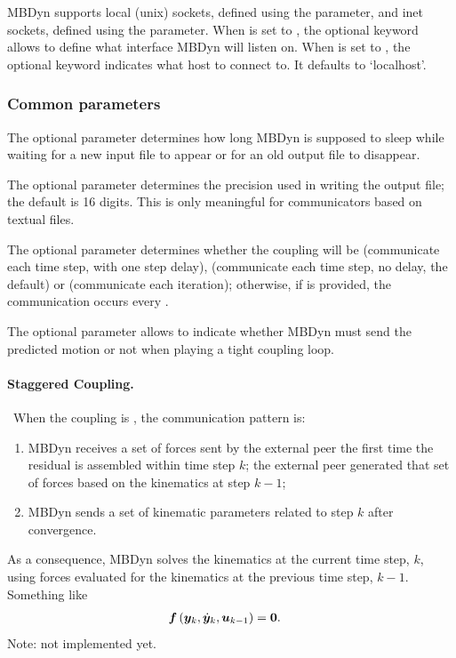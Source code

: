 MBDyn supports local (unix) sockets, defined using the  parameter,
and inet sockets, defined using the  parameter.
When  is set to , the optional keyword 
allows to define what interface MBDyn will listen on.
When  is set to , the optional keyword 
indicates what host to connect to.
It defaults to `localhost'.




\subsubsection{Common parameters}
The optional parameter  determines how long MBDyn
is supposed to sleep while waiting for a new input file to appear
or for an old output file to disappear.

The optional parameter  determines the precision
used in writing the output file; the default is 16 digits.
This is only meaningful for communicators based on textual files.

The optional parameter  determines whether the coupling
will be  (communicate each time step, with one step delay),
 (communicate each time step, no delay, the default) or
 (communicate each iteration); otherwise, if 
is provided, the communication occurs every .

The optional parameter  allows to indicate
whether MBDyn must send the predicted motion or not when playing
a tight coupling loop.


\paragraph{Staggered Coupling.} \
When the coupling is , the communication pattern is:
\begin{enumerate}
\item MBDyn receives a set of forces sent by the external peer
	the first time the residual is assembled within time step $k$;
	the external peer generated that set of forces
	based on the kinematics at step $k-1$;

\item MBDyn sends a set of kinematic parameters related to step $k$
	after convergence.
\end{enumerate}
As a consequence, MBDyn solves the kinematics at the current time step, $k$,
using forces evaluated for the kinematics at the previous time step, $k-1$.
Something like
\begin{align}
	\boldsymbol{f}\left( \boldsymbol{y}_k, \dot{\boldsymbol{y}}_k, \boldsymbol{u}_{k - 1} \right)
	&=
	\boldsymbol{0}
	.
\end{align}
Note: not implemented yet.

